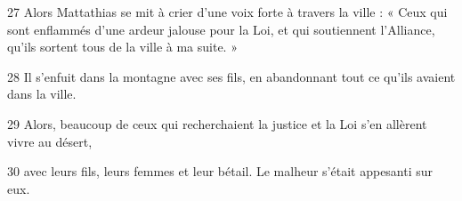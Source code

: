 
27 Alors Mattathias se mit à crier d’une voix forte à travers la ville : « Ceux qui sont enflammés d’une ardeur jalouse pour la Loi, et qui soutiennent l’Alliance, qu’ils sortent tous de la ville à ma suite. »

28 Il s’enfuit dans la montagne avec ses fils, en abandonnant tout ce qu’ils avaient dans la ville.

29 Alors, beaucoup de ceux qui recherchaient la justice et la Loi s’en allèrent vivre au désert,

30 avec leurs fils, leurs femmes et leur bétail. Le malheur s’était appesanti sur eux.
